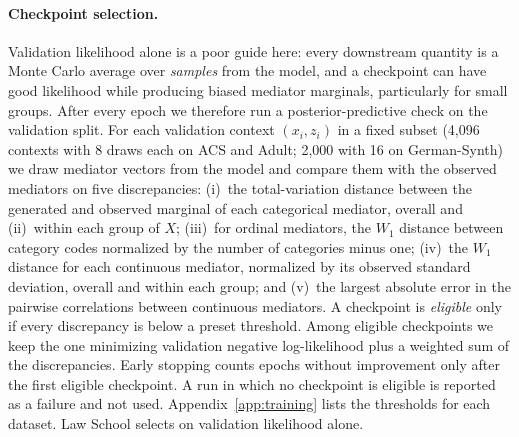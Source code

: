 \paragraph{Checkpoint selection.}
Validation likelihood alone is a poor guide here: every downstream quantity is
a Monte Carlo average over \emph{samples} from the model, and a checkpoint can
have good likelihood while producing biased mediator marginals, particularly for
small groups. After every epoch we therefore run a posterior-predictive check
on the validation split. For each validation context $(x_i,z_i)$ in a fixed
subset (4{,}096 contexts with 8 draws each on ACS and Adult; 2{,}000 with 16
on German-Synth) we draw mediator vectors from the model and compare them
with the observed mediators on five discrepancies:
(i)~the total-variation distance between the generated and observed marginal
of each categorical mediator, overall and
(ii)~within each group of $X$;
(iii)~for ordinal mediators, the $W_1$ distance between category codes
normalized by the number of categories minus one;
(iv)~the $W_1$ distance for each continuous mediator, normalized by its
observed standard deviation, overall and within each group; and
(v)~the largest absolute error in the pairwise correlations between continuous
mediators. A checkpoint is \emph{eligible} only if every discrepancy is below a
preset threshold. Among eligible checkpoints we keep the one minimizing
validation negative log-likelihood plus a weighted sum of the discrepancies.
Early stopping counts epochs without improvement only after the first eligible
checkpoint. A run in which no checkpoint is eligible is reported as a failure
and not used. Appendix~\ref{app:training} lists the thresholds for each
dataset. Law School selects on validation likelihood alone.

